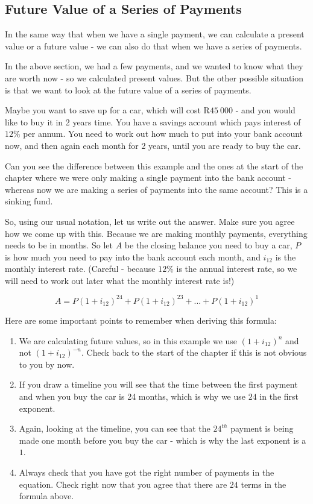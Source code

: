 \subsection{Future Value of a Series of Payments}
In the same way that when we have a single payment, we can calculate a present value or a future value - we can also do that when we have a series of payments.

In the above section, we had a few payments, and we wanted to know what they are worth now - so we calculated present values. But the other possible situation is that we want to look at the future value of a series of payments.

Maybe you want to save up for a car, which will cost R$45~000$ - and you would like to buy it in 2 years time. You have a savings account which pays interest of $12\%$ per annum. You need to work out how much to put into your bank account now, and then again each month for 2 years, until you are ready to buy the car.

Can you see the difference between this example and the ones at the start of the chapter where we were only making a single payment into the bank account - whereas now we are making a series of payments into the same account? This is a sinking fund.

So, using our usual notation, let us write out the answer. Make sure you agree how we come up with this. Because we are making monthly payments, everything needs to be in months. So let $A$ be the closing balance you need to buy a car, $P$ is how much you need to pay into the bank account each month, and $i_{12}$ is the monthly interest rate. (Careful - because $12\%$ is the annual interest rate, so we will need to work out later what the monthly interest rate is!)

\begin{equation*}
A = P(1+i_{12})^{24} + P(1+i_{12})^{23} + ... + P(1+i_{12})^1
\end{equation*}

Here are some important points to remember when deriving this formula:
\begin{enumerate}
\item{We are calculating future values, so in this example we use $(1+i_{12})^n$ and not $(1+i_{12})^{-n}$. Check back to the start of the chapter if this is not obvious to you by now.}
\item{If you draw a timeline you will see that the time between the first payment and when you buy the car is 24 months, which is why we use $24$ in the first exponent.}
\item{Again, looking at the timeline, you can see that the $24^{th}$ payment is being made one month before you buy the car - which is why the last exponent is a $1$.}
\item{Always check that you have got the right number of payments in the equation. Check right now that you agree that there are $24$ terms in the formula above.}
\end{enumerate}

